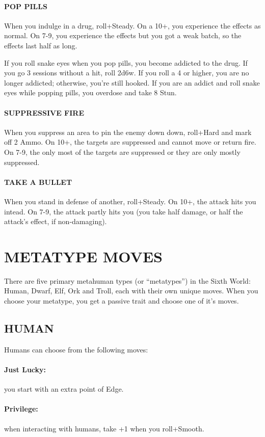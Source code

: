 \paragraph{POP PILLS}
When you indulge in a drug, roll+Steady. On a 10+, you experience the effects as normal. On 7-9, you experience the effects but you got a weak batch, so the effects last half as long.

If you roll snake eyes when you pop pills, you become addicted to the drug. If you go 3 sessions without a hit, roll 2d6w. If you roll a 4 or higher, you are no longer addicted; otherwise, you’re still hooked. If you are an addict and roll snake eyes while popping pills, you overdose and take 8 Stun.


\paragraph{SUPPRESSIVE FIRE}
When you suppress an area to pin the enemy down down, roll+Hard and mark off 2 Ammo. On 10+, the targets are suppressed and cannot move or return fire. On 7-9, the only most of the targets are suppressed or they are only mostly suppressed.

\paragraph{TAKE A BULLET}
When you stand in defense of another, roll+Steady. On 10+, the attack hits you intead. On 7-9, the attack partly hits you (you take half damage, or half the attack’s effect, if non-damaging).



\section{METATYPE MOVES}
There are five primary metahuman types (or ``metatypes'') in the Sixth World: Human, Dwarf, Elf, Ork and Troll, each with their own unique moves. When you choose your metatype, you get a passive trait and choose one of it's moves.

\subsection{HUMAN}
Humans can choose from the following moves:
\paragraph{Just Lucky:} you start with an extra point of Edge.
\paragraph{Privilege:} when interacting with humans, take +1 when you roll+Smooth.

